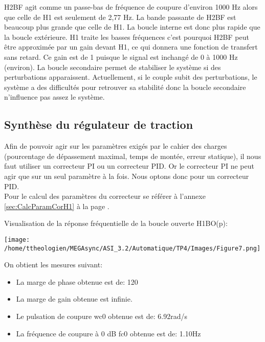 \documentclass[a4paper,12pt]{article}
\begin{document}
			\par H2BF agit comme un passe-bas de fréquence de coupure d'environ 1000 Hz alors que celle de H1 est seulement de 2,77 Hz.
			La bande passante de H2BF est beaucoup plus grande que celle de H1.
			La boucle interne est donc plus rapide que la boucle extérieure.
			H1 traite les basses fréquences c'est pourquoi H2BF peut être approximée par un gain devant H1, ce qui donnera une fonction de transfert sans retard.
			Ce gain est de 1 puisque le signal est inchangé de 0 à 1000 Hz (environ).
			La boucle secondaire permet de stabiliser le système si des perturbations apparaissent.
			Actuellement, si le couple subit des perturbations, le système a des difficultés pour retrouver sa stabilité donc la boucle secondaire n'influence pas assez le système.
			\pagebreak

		\subsection{Synthèse du régulateur de traction}
			\label{sub:syntRegTrac}
			\par Afin de pouvoir agir sur les paramètres exigés par le cahier des charges (pourcentage de dépassement maximal, temps de montée, erreur statique), il nous faut utiliser un correcteur PI ou un correcteur PID.
			Or le correcteur PI ne peut agir que sur un seul paramètre à la fois.
			Nous optons donc pour un correcteur PID.\\
			Pour le calcul des paramètres du correcteur se référer à l'annexe \ref{sec:CalcParamCorH1} à la page \pageref{sec:CalcParamCorH1}.\\

			\par Visualisation de la réponse fréquentielle de la boucle ouverte H1BO(p):
			\begin{center}
				\texttt{[image: /home/ttheologien/MEGAsync/ASI\_3.2/Automatique/TP4/Images/Figure7.png]}
			\end{center}

			\par On obtient les mesures suivant:
			\begin{itemize}
				\item La marge de phase obtenue est de: 120\degre
				\item La marge de gain obtenue est infinie.
				\item Le pulsation de coupure wc0 obtenue est de: 6.92rad/s
				\item La fréquence de coupure à 0 dB fc0 obtenue est de: 1.10Hz\\
			\end{itemize}
			\pagebreak
\end{document}
